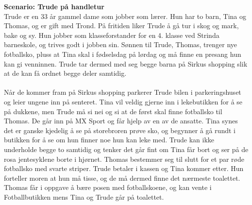 \noindent\textbf{Scenario: Trude på handletur}\\
Trude er en 33 år gammel dame som jobber som lærer. Hun har to barn, Tina og Thomas, og er gift med Trond. På fritiden liker Trude å gå tur i skog og mark, bake og sy. Hun jobber som klasseforstander for en 4. klasse ved Strinda barneskole, og trives godt i jobben sin. Sønnen til Trude, Thomas, trenger nye fotballsko, pluss at Tina skal i fødselsdag på lørdag og må finne en presang hun kan gi venninnen. Trude tar dermed med seg begge barna på Sirkus shopping slik at de kan få ordnet begge deler samtidig. 
\\\\
Når de kommer fram på Sirkus shopping parkerer Trude bilen i parkeringshuset og leier ungene inn på senteret. Tina vil veldig gjerne inn i lekebutikken for å se på dukkene, men Trude må si nei og si at de først skal finne fotballsko til Thomas. De går inn på MX Sport og får hjelp av en av de ansatte. Tina synes det er ganske kjedelig å se på storebroren prøve sko, og begynner å gå rundt i butikken for å se om hun finner noe hun kan leke med. Trude kan ikke underholde begge to samtidig og tenker det går fint om Tina får bort og ser på de rosa jentesyklene borte i hjørnet. Thomas bestemmer seg til slutt for et par røde fotballsko med svarte striper. Trude betaler i kassen og Tina kommer etter. Hun forteller moren at hun må tisse, og de må dermed finne det nærmeste toalettet. Thomas får i oppgave å bære posen med fotballskoene, og kan vente i Fotballbutikken mens Tina og Trude går på toalettet.

